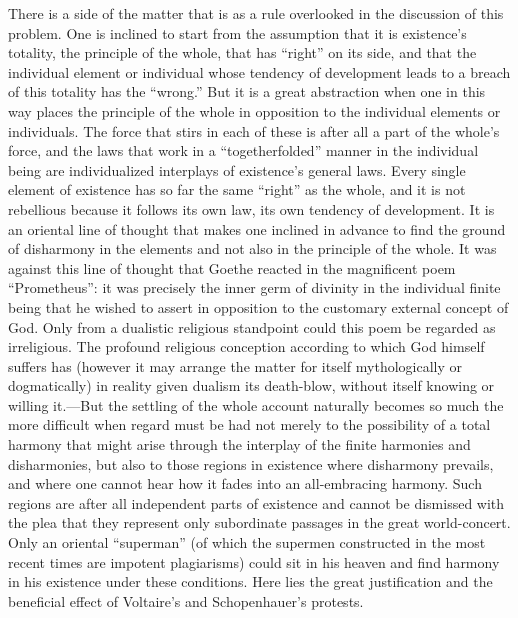 \documentclass[12pt,a4paper]{book}
\newcommand{\opage}[1]{\marginnote{\footnotesize\textit{[#1]}}}
\begin{document}
There is a side of the matter that is as a rule overlooked in the discussion of this problem. One is
inclined to start from the assumption that it is existence's totality, the principle of the whole, that
has ``right'' on its side, and that the individual element or individual whose tendency of development
leads to a breach of this totality has the ``wrong.'' But it is a great abstraction when one in this
way places the principle of the whole in opposition to the individual elements or individuals. The
force that stirs in each of these is after all a part of the whole's force, and the laws that work in a
``togetherfolded'' manner in the individual being are individualized interplays of existence's general
laws. Every single element of existence has so far the same ``right'' as the whole, and it is not
rebellious because it follows its own law, its own tendency of development. It is an oriental line of
thought that makes one inclined in advance to find the ground of disharmony in the elements and not
also in the principle of the whole. It was against this line of thought that Goethe reacted in the
magnificent poem ``Prometheus'': it was precisely the inner germ of divinity in the individual finite
being that he wished to assert in opposition to the 
\opage{182}customary external concept of God. Only from a
dualistic religious standpoint could this poem be regarded as irreligious. The profound religious
conception according to which God himself suffers has (however it may arrange the matter for itself
mythologically or dogmatically) in reality given dualism its death-blow, without itself knowing or
willing it.---But the settling of the whole account naturally becomes so much the more difficult when
regard must be had not merely to the possibility of a total harmony that might arise through the
interplay of the finite harmonies and disharmonies, but also to those regions in existence where
disharmony prevails, and where one cannot hear how it fades into an all-embracing harmony. Such regions
are after all independent parts of existence and cannot be dismissed with the plea that they represent
only subordinate passages in the great world-concert. Only an oriental ``superman'' (of which the
supermen constructed in the most recent times are impotent plagiarisms) could sit in his heaven and
find harmony in his existence under these conditions. Here lies the great justification and the
beneficial effect of Voltaire's and Schopenhauer's protests.
\end{document}
